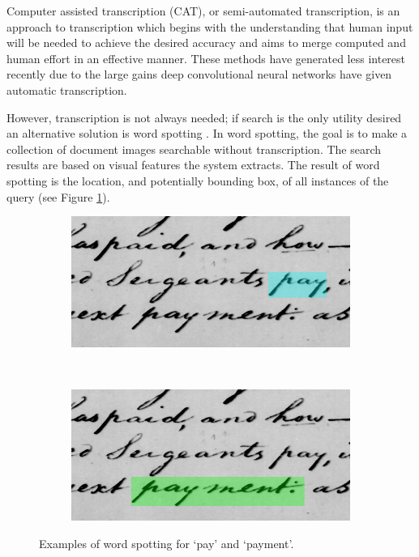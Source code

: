 \documentclass[ms,electronic,twosidetoc,letterpaper,chaptercenter,parttop,lof,lot]{byumsphd}
\begin{document}
Computer assisted transcription (CAT), or semi-automated transcription, is an approach to transcription which begins with the understanding that human input will be needed to achieve the desired accuracy and aims to merge computed and human effort in an effective manner. 
These methods have generated less interest recently due to the large gains deep convolutional neural networks have given automatic transcription.

However, transcription is not always needed; if search is the only utility desired an alternative solution is word spotting \cite{manmatha1996}. In word spotting, the goal is to make a collection of document images searchable without transcription. The search results are based on visual features the system extracts. The result of word spotting is the location, and potentially bounding box, of all instances of the query (see Figure \ref{fig:explain_spotting}). 

\begin{figure}[t]
    \begin{subfigure}{0.46\textwidth}
    		\centering
    		\includegraphics[width=\textwidth]{spotting_explination_pay}
    	\end{subfigure}
    	~
    	\begin{subfigure}{0.46\textwidth}
    		\centering
    		\includegraphics[width=\textwidth]{spotting_explination_payment}
    	\end{subfigure}
    	\caption{Examples of word spotting for `pay' and `payment'.}
    	\label{fig:explain_spotting}
\end{figure}
\end{document}
